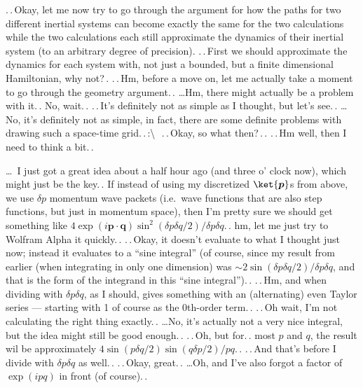 \documentclass{report}
\begin{document}
.\,.\,Okay, let me now try to go through the argument for how the paths for two different inertial systems can become exactly the same for the two calculations while the two calculations each still approximate the dynamics of their inertial system (to an arbitrary degree of precision). .\,.\,First we should approximate the dynamics for each system with, not just a bounded, but a finite dimensional Hamiltonian, why not?\,. .\,.\,Hm, before a move on, let me actually take a moment to go through the geometry argument.\,. 
\ldots Hm, there might actually be a problem with it.\,. No, wait.\,. .\,.\,It's definitely not as simple as I thought, but let's see.\,. \ldots No, it's definitely not as simple, in fact, there are some definite problems with drawing such a space-time grid.\,.\,:\textbackslash\ \,.\,.\,Okay, so what then?\,.\,. .\,.\,Hm well, then I need to think a bit.\,. 

\ldots\ I just got a great idea about a half hour ago (and three o' clock now), which might just be the key.\,. If instead of using my discretized %
$\ket{\boldsymbol{p}}$s from above, we use $\delta p$ momentum wave packets (i.e.\ wave functions that are also step functions, but just in momentum space), then I'm pretty sure we should get something like $4\exp(i \boldsymbol{p}\cdot \boldsymbol{q})\sin^2(\delta p \delta q / 2)/\delta p \delta q$.\,. hm, let me just try to Wolfram Alpha it quickly.\,. .\,.\,Okay, it doesn't evaluate to what I thought just now; instead it evaluates to a ``sine integral'' (of course, since my result from earlier (when integrating in only one dimension) was $\sim 2\sin(\delta p \delta q / 2)/\delta p\delta q$, and that is the form of the integrand in this ``sine integral'').\,. .\,.\,Hm, and when dividing with $\delta p \delta q$, as I should, gives something with an (alternating) even Taylor series --- starting with 1 of course as the 0th-order term.\,. .\,.\,Oh wait, I'm not calculating the right thing exactly.\,. \ldots No, it's actually not a very nice integral, but the idea might still be good enough.\,. .\,.\,Oh, but for.\,. most $p$ and $q$, the result wil be approximately $4\sin(p \delta q/2)\sin(q \delta p/2)/pq$.\,. .\,.\,And that's before I divide with $\delta p\delta q$ as well.\,. .\,.\,Okay, great.\,. 
\ldots Oh, and I've also forgot a factor of $\exp(i p q)$ in front (of course).\,. 
\end{document}
